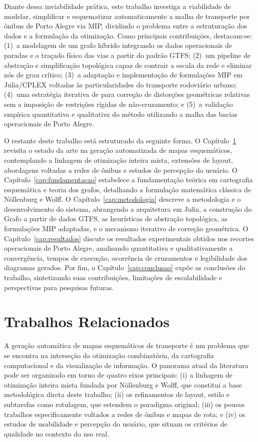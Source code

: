 \documentclass[cic,tc]{infufrgs}
\begin{document}
Diante dessa inviabilidade prática, este trabalho investiga a viabilidade de modelar, simplificar e esquematizar automaticamente a malha de transporte por ônibus de Porto Alegre via MIP, dividindo o problema entre a estruturação dos dados e a formulação da otimização. Como principais contribuições, destacam-se: (1)~a modelagem de um grafo híbrido integrando os dados operacionais de paradas e o traçado físico das vias a partir do padrão GTFS; (2)~um pipeline de abstração e simplificação topológica capaz de contrair a escala da rede e eliminar nós de grau crítico; (3)~a adaptação e implementação de formulações MIP em Julia/CPLEX voltadas às particularidades do transporte rodoviário urbano; (4)~uma estratégia iterativa de para correção de distorções geométricas relativas sem a imposição de restrições rígidas de não-cruzamento; e (5)~a validação empírica quantitativa e qualitativa do método utilizando a malha das bacias operacionais de Porto Alegre.

O restante deste trabalho está estruturado da seguinte forma. O Capítulo~\ref{cap:trabalhos_relacionados} revisita o estado da arte na geração automatizada de mapas esquemáticos, contemplando a linhagem de otimização inteira mista, extensões de layout, abordagens voltadas a redes de ônibus e estudos de percepção do usuário. O Capítulo~\ref{cap:fundamentacao} estabelece a fundamentação teórica em cartografia esquemática e teoria dos grafos, detalhando a formulação matemática clássica de Nöllenburg e Wolff. O Capítulo~\ref{cap:metodologia} descreve a metodologia e o desenvolvimento do sistema, abrangendo a arquitetura em Julia, a construção do Grafo a partir de dados GTFS, as heurísticas de abstração topológica, as formulações MIP adaptadas, e o mecanismo iterativo de correção geométrica. O Capítulo~\ref{cap:resultados} discute os resultados experimentais obtidos nos recortes operacionais de Porto Alegre, analisando quantitativa e qualitativamente a convergência, tempos de execução, ocorrência de cruzamentos e legibilidade dos diagramas gerados. Por fim, o Capítulo~\ref{cap:conclusao} expõe as conclusões do trabalho, sintetizando suas contribuições, limitações de escalabilidade e perspectivas para pesquisas futuras.

\chapter{Trabalhos Relacionados}
\label{cap:trabalhos_relacionados}

A geração automática de mapas esquemáticos de transporte é um problema que se encontra na interseção da otimização combinatória, da cartografia computacional e da visualização de informação. O panorama atual da literatura pode ser organizado em torno de quatro eixos principais: (i) a linhagem de otimização inteira mista fundada por Nöllenburg e Wolff, que constitui a base metodológica direta deste trabalho; (ii) os refinamentos de layout, estilo e subtarefas como rotulagem, que estendem o paradigma original; (iii) os poucos trabalhos especificamente voltados a redes de ônibus e mapas de rota; e (iv) os estudos de usabilidade e percepção do usuário, que situam os critérios de qualidade no contexto do uso real.
\end{document}
